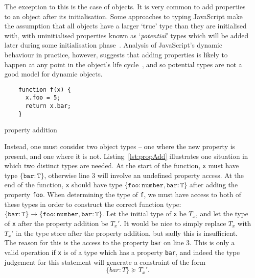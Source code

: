 \documentclass[12pt,a4paper,twoside,openright]{report}
\begin{document}
The exception to this is the case of objects. It is very common to add
properties to an object after its initialisation. Some approaches to typing
JavaScript make the assumption that all objects have a larger `true' type than
they are initialised with, with uninitialised properties known as
`\textit{potential}' types which will be added later during some initialisation
phase~\cite{anderson05}. Analysis of JavaScript's dynamic behaviour in
practice, however, suggests that adding properties is likely to happen at any
point in the object's life cycle~\cite{JSBehaviour}, and so potential types are
not a good model for dynamic objects.

\begin{program}[h]
  \begin{verbatim}
	function f(x) {
	  x.foo = 5;
	  return x.bar;
	}
  \end{verbatim}
  \caption{property addition}\label{lst:propAdd}
\end{program}

Instead, one must consider two object types -- one where the new property is
present, and one where it is not. Listing~\ref{lst:propAdd} illustrates one
situation in which two distinct types are needed. At the start of the function,
\texttt{x} must have type $\mathtt{\{bar:T\}}$, otherwise line 3 will involve
an undefined property access. At the end of the function, \texttt{x} should
have type $\mathtt{\{foo:number, bar:T\}}$ after adding the property
\texttt{foo}.  When determining the type of \texttt{f}, we must have access to
both of these types in order to construct the correct function type:
$\mathtt{\{bar:T\} \rightarrow \{foo:number, bar:T\}}$. Let the initial type of
\texttt{x} be $T_x$, and let the type of \texttt{x} after the property addition
be $T_x'$. It would be nice to simply replace $T_x$ with $T_x'$ in the type
store after the property addition, but sadly this is insufficient. The reason
for this is the access to the property \texttt{bar} on line 3.  This is only a
valid operation if \texttt{x} is of a type which has a property \texttt{bar},
and indeed the type judgement for this statement will generate a constraint of
the form 
\begin{equation}
  \label{eq:barC}
  \{bar:T\} \succeq T_x'.
\end{equation}
\end{document}
